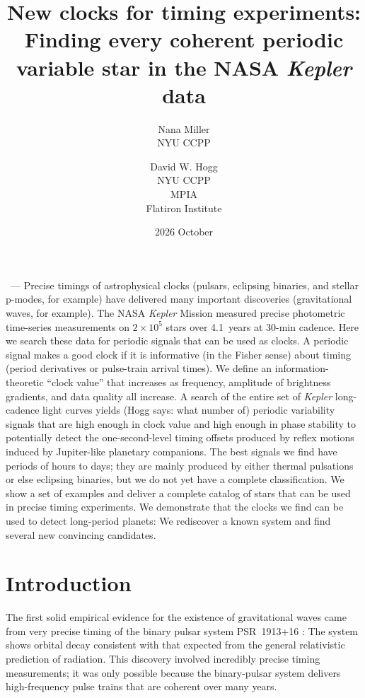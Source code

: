 \documentclass{article}
\title{\bfseries%
New clocks for timing experiments:\\ Finding every coherent periodic variable star in the NASA \textsl{Kepler} data
}
\author{Nana Miller\\NYU CCPP \and David W. Hogg\\NYU CCPP\\MPIA\\Flatiron Institute}
\date{2026 October}
\renewcommand{\paragraph}[1]{\medskip\par\noindent{\textbf{#1}}~---}
\newcommand{\hogg}[1]{{\color{blue} (Hogg says: #1)}}
\begin{document}
\maketitle

\paragraph{Abstract}
Precise timings of astrophysical clocks (pulsars, eclipsing binaries, and stellar p-modes, for example) have delivered many important discoveries (gravitational waves, for example).
The NASA \textsl{Kepler} Mission measured precise photometric time-series measurements on $2\times10^5$ stars over 4.1~years at 30-min cadence.
Here we search these data for periodic signals that can be used as clocks.
A periodic signal makes a good clock if it is informative (in the Fisher sense) about timing (period derivatives or pulse-train arrival times).
We define an information-theoretic ``clock value'' that increases as frequency, amplitude of brightness gradients, and data quality all increase.
A search of the entire set of \textsl{Kepler} long-cadence light curves yields \hogg{what number of} periodic variability signals that are high enough in clock value and high enough in phase stability to potentially detect the one-second-level timing offsets produced by reflex motions induced by Jupiter-like planetary companions.
The best signals we find have periods of hours to days; they are mainly produced by either thermal pulsations or else eclipsing binaries, but we do not yet have a complete classification.
We show a set of examples and deliver a complete catalog of  stars that can be used in precise timing experiments.
We demonstrate that the clocks we find can be used to detect long-period planets:
We rediscover a known system and find several new convincing candidates.

\section{Introduction}\label{sec:intro}
The first solid empirical evidence for the existence of gravitational waves came from very precise timing of the binary pulsar system PSR~1913+16 \cite{binarypulsar}:
The system shows orbital decay consistent with that expected from the general relativistic prediction of radiation.
This discovery involved incredibly precise timing measurements; it was only possible because the binary-pulsar system delivers high-frequency pulse trains that are coherent over many years.
\end{document}
